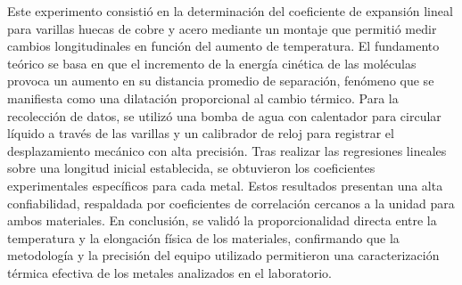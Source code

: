 Este experimento consistió en la determinación del coeficiente de expansión lineal para varillas huecas de cobre y acero mediante un montaje que permitió medir cambios longitudinales en función del aumento de temperatura. El fundamento teórico se basa en que el incremento de la energía cinética de las moléculas provoca un aumento en su distancia promedio de separación, fenómeno que se manifiesta como una dilatación proporcional al cambio térmico. Para la recolección de datos, se utilizó una bomba de agua con calentador para circular líquido a través de las varillas y un calibrador de reloj para registrar el desplazamiento mecánico con alta precisión. Tras realizar las regresiones lineales sobre una longitud inicial establecida, se obtuvieron los coeficientes experimentales específicos para cada metal. Estos resultados presentan una alta confiabilidad, respaldada por coeficientes de correlación cercanos a la unidad para ambos materiales. En conclusión, se validó la proporcionalidad directa entre la temperatura y la elongación física de los materiales, confirmando que la metodología y la precisión del equipo utilizado permitieron una caracterización térmica efectiva de los metales analizados en el laboratorio.
